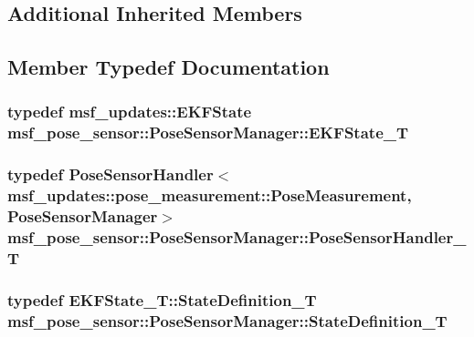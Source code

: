 \subsection*{Additional Inherited Members}


\subsection{Member Typedef Documentation}
\hypertarget{classmsf__pose__sensor_1_1PoseSensorManager_a1b470ca74ac6b8d26ccfe503d3387422}{
\subsubsection[{E\-K\-F\-State\-\_\-\-T}]{\setlength{\rightskip}{0pt plus 5cm}typedef {\bf msf\-\_\-updates\-::\-E\-K\-F\-State} {\bf msf\-\_\-pose\-\_\-sensor\-::\-Pose\-Sensor\-Manager\-::\-E\-K\-F\-State\-\_\-\-T}}}\label{classmsf__pose__sensor_1_1PoseSensorManager_a1b470ca74ac6b8d26ccfe503d3387422}
\hypertarget{classmsf__pose__sensor_1_1PoseSensorManager_a424c57464ea7530998340db1e820688a}{
\subsubsection[{Pose\-Sensor\-Handler\-\_\-\-T}]{\setlength{\rightskip}{0pt plus 5cm}typedef Pose\-Sensor\-Handler$<$msf\-\_\-updates\-::pose\-\_\-measurement\-::\-Pose\-Measurement, {\bf Pose\-Sensor\-Manager}$>$ {\bf msf\-\_\-pose\-\_\-sensor\-::\-Pose\-Sensor\-Manager\-::\-Pose\-Sensor\-Handler\-\_\-\-T}\hspace{0.3cm}{\ttfamily [private]}}}\label{classmsf__pose__sensor_1_1PoseSensorManager_a424c57464ea7530998340db1e820688a}
\hypertarget{classmsf__pose__sensor_1_1PoseSensorManager_a192e211ad0579d4517378acc155652f7}{
\subsubsection[{State\-Definition\-\_\-\-T}]{\setlength{\rightskip}{0pt plus 5cm}typedef {\bf E\-K\-F\-State\-\_\-\-T\-::\-State\-Definition\-\_\-\-T} {\bf msf\-\_\-pose\-\_\-sensor\-::\-Pose\-Sensor\-Manager\-::\-State\-Definition\-\_\-\-T}}}\label{classmsf__pose__sensor_1_1PoseSensorManager_a192e211ad0579d4517378acc155652f7}
